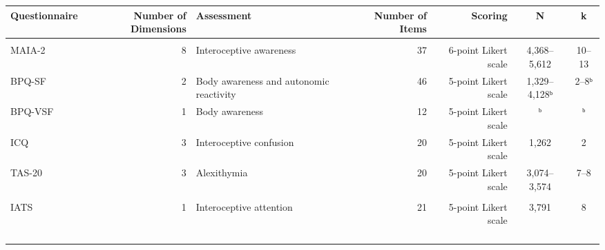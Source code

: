 \begin{table}
\fontsize{7.0pt}{8.0pt}\selectfont
\begin{tabular*}{\linewidth}{@{\extracolsep{\fill}}lrlrrcc}
\toprule
Questionnaire & Number of Dimensions & Assessment & Number of Items & Scoring & N & k \\ 
\midrule\addlinespace[2.5pt]
{\bfseries Interoceptive Related} &  &  &  &  &  &  \\ 
MAIA-2 & 8 & Interoceptive awareness & 37 & 6-point Likert scale & 4,368–5,612 & 10–13 \\ 
BPQ-SF & 2 & Body awareness and autonomic reactivity & 46 & 5-point Likert scale & 1,329–4,128ᵇ & 2–8ᵇ \\ 
BPQ-VSF & 1 & Body awareness & 12 & 5-point Likert scale & ᵇ & ᵇ \\ 
ICQ & 3 & Interoceptive confusion & 20 & 5-point Likert scale & 1,262 & 2 \\ 
TAS-20 & 3 & Alexithymia & 20 & 5-point Likert scale & 3,074–3,574 & 7–8 \\ 
{\cellcolor[HTML]{FFF8E1}{BVAQ}} & {\cellcolor[HTML]{FFF8E1}{5}} & {\cellcolor[HTML]{FFF8E1}{Alexithymia}} & {\cellcolor[HTML]{FFF8E1}{40}} & {\cellcolor[HTML]{FFF8E1}{5-point Likert scale}} & {\cellcolor[HTML]{FFF8E1}{814}} & {\cellcolor[HTML]{FFF8E1}{1}} \\ 
IATS & 1 & Interoceptive attention & 21 & 5-point Likert scale & 3,791 & 8 \\ 
{\cellcolor[HTML]{FFF8E1}{NIES}} & {\cellcolor[HTML]{FFF8E1}{1}} & {\cellcolor[HTML]{FFF8E1}{Negative interoceptive evaluation}} & {\cellcolor[HTML]{FFF8E1}{20}} & {\cellcolor[HTML]{FFF8E1}{5-point Likert scale}} & {\cellcolor[HTML]{FFF8E1}{519}} & {\cellcolor[HTML]{FFF8E1}{1}} \\ 
{\cellcolor[HTML]{FFF8E1}{ISQ}} & {\cellcolor[HTML]{FFF8E1}{1}} & {\cellcolor[HTML]{FFF8E1}{Interoceptive difficulties}} & {\cellcolor[HTML]{FFF8E1}{20}} & {\cellcolor[HTML]{FFF8E1}{7-point Likert scale}} & {\cellcolor[HTML]{FFF8E1}{393}} & {\cellcolor[HTML]{FFF8E1}{1}} \\ 
{\cellcolor[HTML]{FFF8E1}{PBCS}} & {\cellcolor[HTML]{FFF8E1}{1}} & {\cellcolor[HTML]{FFF8E1}{Private body consciousness}} & {\cellcolor[HTML]{FFF8E1}{5}} & {\cellcolor[HTML]{FFF8E1}{5-point Likert scale}} & {\cellcolor[HTML]{FFF8E1}{802}} & {\cellcolor[HTML]{FFF8E1}{1}} \\ 
{\cellcolor[HTML]{FFF8E1}{BAQ}} & {\cellcolor[HTML]{FFF8E1}{1}} & {\cellcolor[HTML]{FFF8E1}{Body awareness}} & {\cellcolor[HTML]{FFF8E1}{18}} & {\cellcolor[HTML]{FFF8E1}{7-point Likert scale}} & {\cellcolor[HTML]{FFF8E1}{802}} & {\cellcolor[HTML]{FFF8E1}{1}} \\ 

\end{tabular*}
\end{table}
